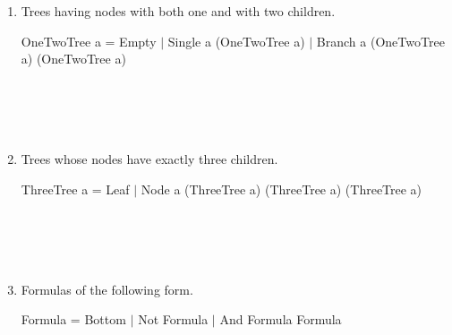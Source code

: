 \documentclass[11pt]{article}
\begin{document}
\begin{enumerate}
\item{} Trees having nodes with both one and with two children.
\begin{program**}
\> OneTwoTree a = Empty $\mid$ Single a (OneTwoTree a) $\mid$ Branch a (OneTwoTree a) (OneTwoTree a)\\
\> \\
\> \\
\> \\
\> \\
\end{program**}

\item{} Trees whose nodes have exactly three children.
\begin{program**}
\> ThreeTree a = Leaf $\mid$ Node a (ThreeTree a) (ThreeTree a) (ThreeTree a) \\
\> \\
\> \\
\> \\
\> \\
\end{program**}

\item{} Formulas of the following form.
\begin{program**}
\> Formula = Bottom  $\mid$ Not Formula $\mid$ And Formula Formula  \\
\> \\
\> \\
\> \\
\> \\
\end{program**}


\end{enumerate}
 
\end{document}

